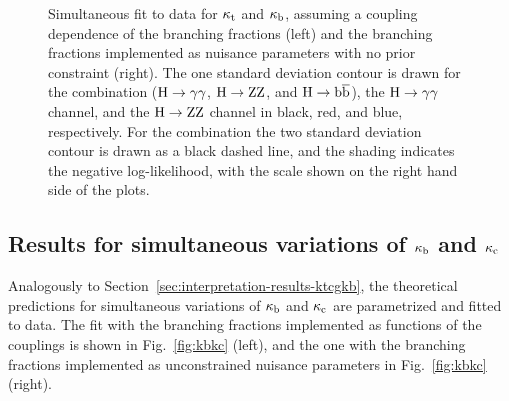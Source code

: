 \begin{figure}[hbtp]
\begin{center}
{        }
    \caption{
        Simultaneous fit to data for $\kappa_{\mathrm{t}}$ and $\kappa_{\mathrm{b}}$, assuming a coupling dependence of the branching fractions (left) and the branching fractions implemented as nuisance parameters with no prior constraint (right).
        The one standard deviation contour is drawn for the combination ($\mathrm{H}\to\mathrm{\gamma}\mathrm{\gamma}$, $\mathrm{H}\to\mathrm{Z}\mathrm{Z}$, and $\mathrm{H}\to\mathrm{b}\overline{\mathrm{b}}$), the $\mathrm{H}\to\mathrm{\gamma}\mathrm{\gamma}$ channel, and the $\mathrm{H}\to\mathrm{Z}\mathrm{Z}$ channel in black, red, and blue, respectively.
        For the combination the two standard deviation contour is drawn as a black dashed line, and the shading indicates the negative log-likelihood, with the scale shown on the right hand side of the plots.
        }
    \label{fig:ktkb}
  \end{center}
\end{figure}


\subsection{Results for simultaneous variations of \texorpdfstring{$\kappa_{\mathrm{b}}$}{kb} and \texorpdfstring{$\kappa_{\mathrm{c}}$}{kc}}
\label{sec:interpretation-results-kbkc}


Analogously to Section~\ref{sec:interpretation-results-ktcgkb}, the theoretical predictions for simultaneous variations of $\kappa_{\mathrm{b}}$ and $\kappa_{\mathrm{c}}$ are parametrized and fitted to data.
% 
The fit with the branching fractions implemented as functions of the couplings is shown in Fig.~\ref{fig:kbkc} (left), and the one with the branching fractions implemented as unconstrained nuisance parameters in Fig.~\ref{fig:kbkc} (right).


